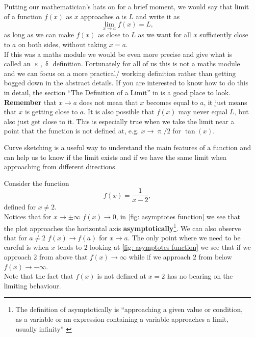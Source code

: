 \begin{mdiv}
Putting our mathematician's hats on for a brief moment, we would say that limit of a function $f(x)$ as $x$ approaches $a$ is $L$ and write it as
\begin{equation*}
\lim_{x\to a}f(x)=L,
\end{equation*}
as long as we can make $f(x)$ as close to $L$ as we want for all $x$ sufficiently close to $a$ on both sides, without taking $x=a$.\\

If this was a maths module we would be even more precise and give what is called an $\upepsilon,\updelta$ definition. Fortunately for all of us this is not a maths module and we can focus on a more practical/ working  definition rather than getting bogged down in the abstract details. If you are interested to know how to do this in detail, the section ``The Definition of a Limit'' in \citep{calcI} is a good place to look.  \\

\textbf{Remember} that $x\to a$ does not mean that $x$ becomes equal to $a$, it just means that $x$ is getting close to $a$. It is also possible that $f(x)$ may never equal $L$, but also just get close to it. This is especially true when we take the limit  near a point that the function is not defined at, e.g. $x\to \uppi/2$ for $\tan(x)$.
\end{mdiv}

Curve sketching is a useful way to understand the main features of a function and can help us to know if the limit exists and if we have the same limit when approaching from different directions. 

\begin{ex}
Consider the function 
\begin{equation}
f(x)=\frac{1}{x-2},
\label{eq: reciprocal of x-2}
\end{equation}
defined for $x\neq 2$.\\

Notices that for $x\to\pm \infty$ $f(x)\to 0$, in \cref{fig: asymptotes function} we see that the plot approaches the horizontal axis \textbf{asymptotically}\footnote{The definition of asymptotically is ``approaching a given value or condition, as a variable or an expression containing a variable approaches a limit, usually infinity'' \citep{collins:asymptotically}}. We can also observe that for $a\neq 2$ $f(x)\to f(a)$ for $x\to a$.  The only point where we need to be careful is when $x$ tends to $2$ looking at \cref{fig: asymptotes function} we see that if we approach $2$ from above that $f(x)\to \infty$ while if we approach $2$ from below $f(x)\to -\infty$. \\

Note that the fact that $f(x)$ is not defined at $x=2$ has no bearing on the limiting behaviour.

\end{ex}

